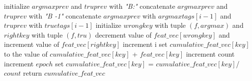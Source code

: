 \documentclass[11pt]{article}
\begin{document}
\begin{algorithm}[htb]
\begin{algorithmic}[1]
		      \ENDIF
		      \STATE initialize $argmaxprev$ and $truprev$ with \textit{"B:"}
		        \STATE concatenate $argmaxprev$ and $truprev$ with \textit{"B -1"}
		      \ELSE
		        \STATE concatenate $argmaxprev$ with $argmaxtags[i-1]$ and $truprev$ with $truetags[i-1]$
		      \ENDIF
		      \STATE initialize $wrongkey$ with tuple $(f, argmax)$ and $rightkey$ with tuple $(f, tru)$
		      \STATE decrement value of $feat\_vec[wrongkey]$ and increment value of $feat\_vec[rightkey]$
		      \STATE increment i
		    \ENDFOR
		      \STATE set $cumulative\_feat\_vec[key]$ to the value of $cumulative\_feat\_vec[key]$ + $feat\_vec[key]$
		    \ENDFOR
		    \STATE increment count
		  \ENDFOR
		  \STATE increment $epoch$
		\ENDWHILE
		  \STATE set $cumulative\_feat\_vec[key]$ = $cumulative\_feat\_vec[key]$/$count$
		\ENDFOR
		\STATE return $cumulative\_feat\_vec$
	\end{algorithmic}
\end{algorithm}
\end{document}
